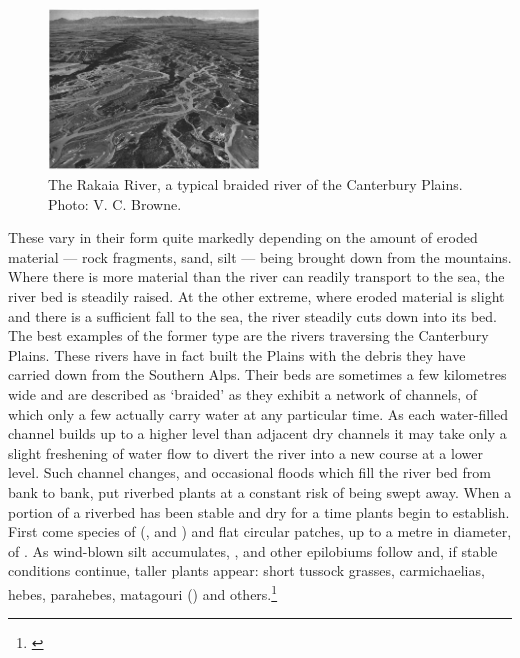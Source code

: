 \begin{figure}
	\includegraphics[width=0.5\textwidth]{graphics/figure87rakaia.jpg}
	\centering
	\caption[The Rakaia River]{The Rakaia River, a typical braided river of the Canterbury Plains.
	Photo: V. C. Browne.}
	\label{fig:87rakaia}
\end{figure}

These vary in their form quite markedly depending on the amount of eroded material — rock fragments, sand, silt — being brought down from the mountains.
Where there is more material than the river can readily transport to the sea, the river bed is steadily raised.
At the other extreme, where eroded material is slight and there is a sufficient fall to the sea, the river steadily cuts down into its bed.
The best examples of the former type are the rivers traversing the Canterbury Plains.
These rivers have in fact built the Plains with the debris they have carried down from the Southern Alps.
Their beds are sometimes a few kilometres wide and are described as `braided' as they exhibit a network of channels, of which only a few actually carry water at any particular time.
As each water-filled channel builds up to a higher level than adjacent dry channels it may take only a slight freshening of water flow to divert the river into a new course at a lower level.
Such channel changes, and occasional floods which fill the river bed from bank to bank, put riverbed plants at a constant risk of being swept away.
When a portion of a riverbed has been stable and dry for a time plants begin to establish.
First come species of  (,  and ) and flat circular patches, up to a metre in diameter, of .
As wind-blown silt accumulates, ,  and other epilobiums follow and, if stable conditions continue, taller plants appear: short tussock grasses, carmichaelias, hebes, parahebes, matagouri () and others.\footnote{\cite{calder1961plant}}

